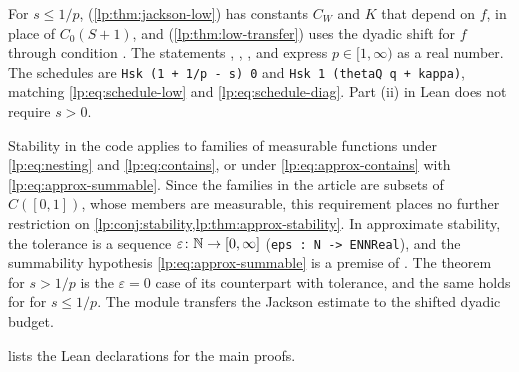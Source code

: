 \documentclass[11pt,a4paper]{article}
\begin{document}
For $s\le1/p$,  (\cref{lp:thm:jackson-low}) has constants $C_W$ and $K$ that depend on $f$, in place of $C_0(S+1)$, and  (\cref{lp:thm:low-transfer}) uses the dyadic shift for $f$ through condition . The statements , , , and  express $p\in[1,\infty)$ as a real number. The schedules are \texttt{Hsk (1 + 1/p - s) 0} and \texttt{Hsk 1 (thetaQ q + kappa)}, matching \eqref{lp:eq:schedule-low} and \eqref{lp:eq:schedule-diag}. Part (ii) in Lean does not require $s>0$.

Stability in the code applies to families of measurable functions under \eqref{lp:eq:nesting} and \eqref{lp:eq:contains}, or under \eqref{lp:eq:approx-contains} with \eqref{lp:eq:approx-summable}. Since the families in the article are subsets of $C([0,1])$, whose members are measurable, this requirement places no further restriction on \cref{lp:conj:stability,lp:thm:approx-stability}. In approximate stability, the tolerance is a sequence $\varepsilon\colon\mathbb N\to[0,\infty]$ (\texttt{eps : N -> ENNReal}), and the summability hypothesis \eqref{lp:eq:approx-summable} is a premise of . The theorem  for $s>1/p$ is the $\varepsilon=0$ case of its counterpart with tolerance, and the same holds for  for $s\le1/p$. The  module transfers the Jackson estimate to the shifted dyadic budget.

 lists the Lean declarations for the main proofs.
\end{document}
